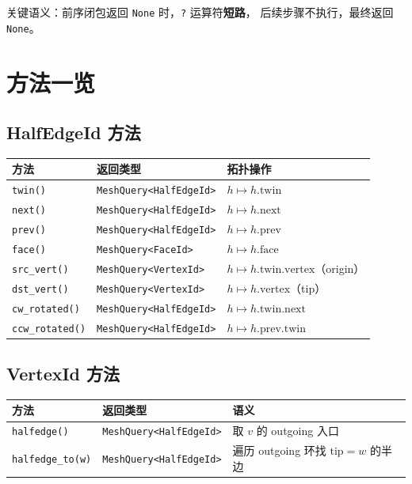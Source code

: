 \documentclass[11pt,a4paper]{article}
\begin{document}
关键语义：前序闭包返回 \texttt{None} 时，\texttt{?} 运算符\textbf{短路}，
后续步骤不执行，最终返回 \texttt{None}。

\section{方法一览}

\subsection{HalfEdgeId 方法}

\begin{center}
\renewcommand{\arraystretch}{1.18}
\begin{tabular}{@{}lll@{}}
  \toprule
  \textbf{方法} & \textbf{返回类型} & \textbf{拓扑操作} \\
  \midrule
  \texttt{twin()}       & \texttt{MeshQuery<HalfEdgeId>} & $h \mapsto h.\mathrm{twin}$ \\
  \texttt{next()}       & \texttt{MeshQuery<HalfEdgeId>} & $h \mapsto h.\mathrm{next}$ \\
  \texttt{prev()}       & \texttt{MeshQuery<HalfEdgeId>} & $h \mapsto h.\mathrm{prev}$ \\
  \texttt{face()}       & \texttt{MeshQuery<FaceId>}     & $h \mapsto h.\mathrm{face}$ \\
  \texttt{src\_vert()}  & \texttt{MeshQuery<VertexId>}   & $h \mapsto h.\mathrm{twin}.\mathrm{vertex}$（origin） \\
  \texttt{dst\_vert()}  & \texttt{MeshQuery<VertexId>}   & $h \mapsto h.\mathrm{vertex}$（tip） \\
  \texttt{cw\_rotated()}  & \texttt{MeshQuery<HalfEdgeId>} & $h \mapsto h.\mathrm{twin}.\mathrm{next}$ \\
  \texttt{ccw\_rotated()} & \texttt{MeshQuery<HalfEdgeId>} & $h \mapsto h.\mathrm{prev}.\mathrm{twin}$ \\
  \bottomrule
\end{tabular}
\end{center}

\subsection{VertexId 方法}

\begin{center}
\renewcommand{\arraystretch}{1.18}
\begin{tabular}{@{}lll@{}}
  \toprule
  \textbf{方法} & \textbf{返回类型} & \textbf{语义} \\
  \midrule
  \texttt{halfedge()}       & \texttt{MeshQuery<HalfEdgeId>} & 取 $v$ 的 outgoing 入口 \\
  \texttt{halfedge\_to(w)}  & \texttt{MeshQuery<HalfEdgeId>} & 遍历 outgoing 环找 $\mathrm{tip}=w$ 的半边 \\
  \bottomrule
\end{tabular}
\end{center}
\end{document}
